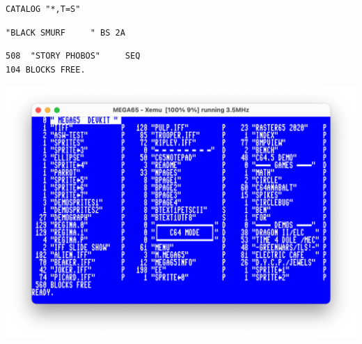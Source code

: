\begin{description}[leftmargin=2cm,style=nextline]
\begin{tcolorbox}[colback=black,coltext=white]
\verbatimfont{\codefont}
\begin{verbatim}
CATALOG "*,T=S"
\end{verbatim}
\selectfont{\codefont 0}
\begin{tcolorbox}[colback=white,coltext=black,arc=0mm,boxrule=0mm,
       left*=0.5mm,right*=0mm,top=0mm,bottom=0mm,nobeforeafter,
       left skip=0.5mm,
       width=28mm,height=3mm,valign=center]
\begin{verbatim}
"BLACK SMURF     " BS 2A
\end{verbatim}
\end{tcolorbox}
\begin{verbatim}
508  "STORY PHOBOS"     SEQ
104 BLOCKS FREE.
\end{verbatim}
\end{tcolorbox}
\includegraphics[width=\linewidth]{images/directory.png}
\end{description}


\newpage

